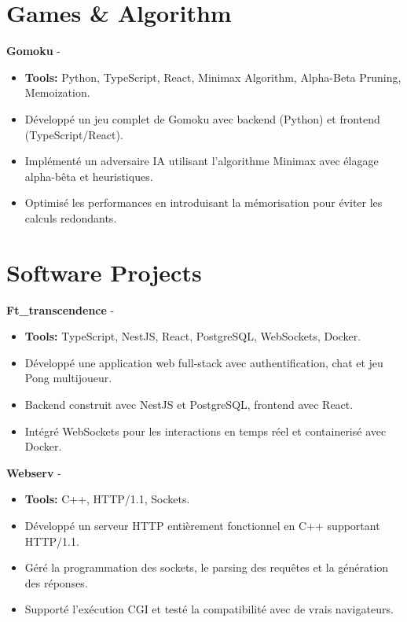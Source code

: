 \documentclass[a4paper,11pt]{article}%
\begin{document}
\section*{Games \& Algorithm}%
%
\noindent \textbf{Gomoku} - \href{https://github.com/sboof911/Gomoku}{{}}%
\begin{itemize}[leftmargin=2em,parsep=0pt,topsep=1em]%
\item[] \textbf{Tools:} Python, TypeScript, React, Minimax Algorithm, Alpha-Beta Pruning, Memoization.%
\item D\'evelopp\'e un jeu complet de Gomoku avec backend (Python) et frontend (TypeScript/React).%
\item Impl\'ement\'e un adversaire IA utilisant l'algorithme Minimax avec \'elagage alpha-b\^eta et heuristiques.%
\item Optimis\'e les performances en introduisant la m\'emorisation pour \'eviter les calculs redondants.%
\end{itemize}%
%
\section*{Software Projects}%
%
\noindent \textbf{Ft\_transcendence} - \href{https://github.com/sboof911/ft_transcendence}{{}}%
\begin{itemize}[leftmargin=2em,parsep=0pt,topsep=1em]%
\item[] \textbf{Tools:} TypeScript, NestJS, React, PostgreSQL, WebSockets, Docker.%
\item D\'evelopp\'e une application web full-stack avec authentification, chat et jeu Pong multijoueur.%
\item Backend construit avec NestJS et PostgreSQL, frontend avec React.%
\item Int\'egr\'e WebSockets pour les interactions en temps r\'eel et containeris\'e avec Docker.%
\end{itemize}%
%
\noindent \textbf{Webserv} - \href{https://github.com/sboof911/webserv}{{}}%
\begin{itemize}[leftmargin=2em,parsep=0pt,topsep=1em]%
\item[] \textbf{Tools:} C++, HTTP/1.1, Sockets.%
\item D\'evelopp\'e un serveur HTTP enti\`erement fonctionnel en C++ supportant HTTP/1.1.%
\item G\'er\'e la programmation des sockets, le parsing des requ\^etes et la g\'en\'eration des r\'eponses.%
\item Support\'e l'ex\'ecution CGI et test\'e la compatibilit\'e avec de vrais navigateurs.%
\end{itemize}%
\end{document}
